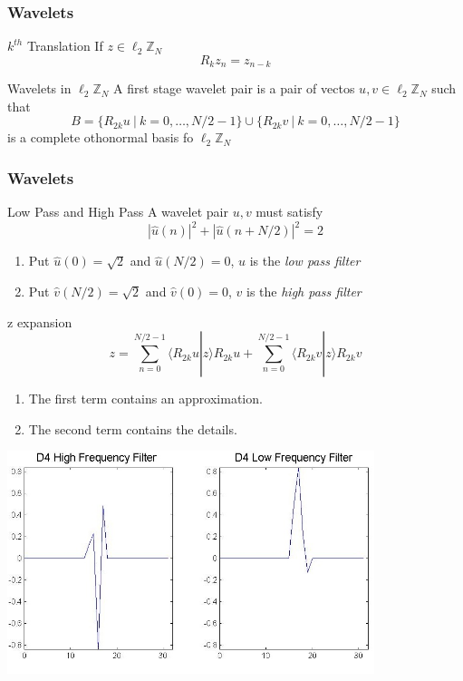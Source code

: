 \documentclass[10pt]{beamer}
\newcommand{\Z}{\mathbb{Z}}
\begin{document}
\begin{frame}
\frametitle{Wavelets}
\begin{block}{$k^{th}$ Translation}
If $z\in \ell_2 \Z_N$
$$
R_k z_n=z_{n-k}
$$
\end{block}
\begin{block}{Wavelets in $\ell_2 \Z_N$}
A first stage wavelet pair is a pair of vectos $u,v \in \ell_2 \Z_N$ such that
$$
B= \{ R_{2k}u \ | \ k=0,\ldots,N/2-1 \} \cup \{ R_{2k}v \ | \ k=0,\ldots,N/2-1 \}
$$
is a complete othonormal basis fo $\ell_2 \Z_N$
\end{block}
\end{frame}

\begin{frame}
\frametitle{Wavelets}
\begin{block}{Low Pass and High Pass}
A wavelet pair $u,v$ must satisfy
$$
|\hat u(n)|^2+|\hat u(n+N/2)|^2=2
$$
\begin{enumerate}
\item \pause Put $\hat u (0)=\sqrt 2$ and $\hat u (N/2)=0$, $u$ is the \emph{low pass filter}
\item \pause Put $\hat v (N/2)=\sqrt 2$ and $\hat v (0)=0$, $v$ is the \emph{high pass filter}
\end{enumerate}
\end{block}
\begin{block}
{z expansion}
$$
z=\sum_{n=0}^{N/2-1}\langle R_{2k}u|z \rangle  R_{2k}u+\sum_{n=0}^{N/2-1}\langle R_{2k}v|z \rangle  R_{2k}v
$$
\begin{enumerate}
\item \pause The first term contains an approximation.
\item \pause The second term contains the details.
\end{enumerate}
\end{block}
\end{frame}

\begin{frame}
\includegraphics[height=6.5cm]{d4Pair}
\end{frame}
\end{document}
